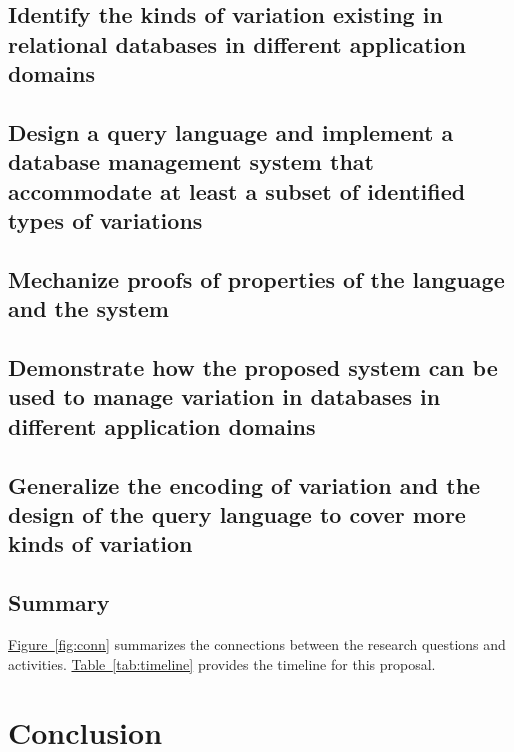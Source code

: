 \documentclass[11pt]{article}
\newcommand{\tabref}[1]{\hyperref[tab:#1]{Table~\ref*{tab:#1}}}
\newcommand{\figref}[1]{\hyperref[fig:#1]{Figure~\ref*{fig:#1}}}
\begin{document}
\subsection{Identify the kinds of variation existing in relational databases in 
different application domains}
\label{sec:ro1}

\subsection{Design a query language and implement a database management 
system that accommodate at least a subset of identified types of variations}
\label{sec:ro2}

\subsection{Mechanize proofs of properties of the language and the system}
\label{sec:ro3}

\subsection{Demonstrate how the proposed system can be used to manage
variation in databases in different application domains}
\label{sec:ro4}

\subsection{Generalize the encoding of variation and the design of the query 
language to cover more kinds of variation}
\label{sec:ro5}

\subsection{Summary}
\label{sec:sum}

\figref{conn} summarizes the connections between the research questions and activities.
\tabref{timeline} provides the timeline for this proposal.

\section{Conclusion}
\label{sec:con}




\newpage



\appendix
\end{document}
